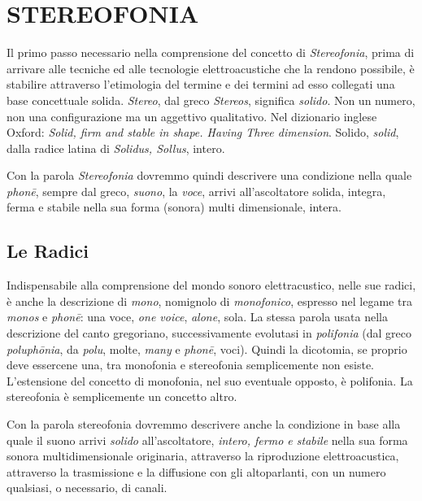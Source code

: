 
\chapter{STEREOFONIA}
\startcontents[chapters]

\vfill\null

Il primo passo necessario nella comprensione del concetto di \emph{Stereofonia},
prima di arrivare alle tecniche ed alle tecnologie elettroacustiche che la
rendono possibile, è stabilire attraverso l'etimologia del termine e dei
termini ad esso collegati una base concettuale solida. \emph{Stereo}, dal greco
\emph{Stereos}, significa \emph{solido}. Non un numero, non una configurazione
ma un aggettivo qualitativo. Nel dizionario inglese Oxford: \emph{Solid, firm
and stable in shape. Having Three dimension}. Solido, \emph{solid}, dalla radice
latina di \emph{Solidus, Sollus}, intero.

Con la parola \emph{Stereofonia} dovremmo quindi descrivere una condizione
nella quale \emph{phon\={e}}, sempre dal greco, \emph{suono}, la \emph{voce},
arrivi all'ascoltatore solida, integra, ferma e stabile nella sua forma (sonora)
multi dimensionale, intera.

\clearpage

\section{Le Radici}

Indispensabile alla comprensione del mondo sonoro elettracustico, nelle sue
radici, è anche la descrizione di \emph{mono}, nomignolo di \emph{monofonico},
espresso nel legame tra \emph{monos} e \emph{phon\={e}}: una voce,
\emph{one voice}, \emph{alone}, sola. La stessa parola usata nella descrizione
del canto gregoriano, successivamente evolutasi in \emph{polifonia} (dal greco
\emph{poluph\={o}nia}, da \emph{polu}, molte, \emph{many} e \emph{phon\={e}},
voci). Quindi la dicotomia, se proprio deve essercene una, tra monofonia e
stereofonia semplicemente non esiste. L'estensione del concetto di monofonia,
nel suo eventuale opposto, è polifonia. La stereofonia è semplicemente un
concetto altro.

Con la parola stereofonia dovremmo descrivere anche la condizione in base alla
quale il suono arrivi \emph{solido} all'ascoltatore, \emph{intero, fermo e
stabile} nella sua forma sonora multidimensionale originaria, attraverso
la riproduzione elettroacustica, attraverso la trasmissione e la diffusione con
gli altoparlanti, con un numero qualsiasi, o necessario, di canali.

